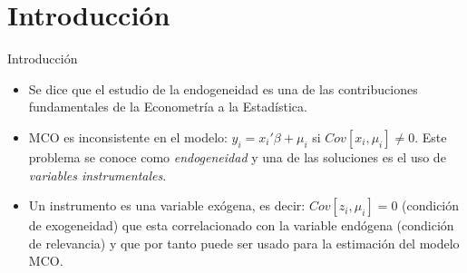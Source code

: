 \section{Introducción}

\begin{frame}{Introducción}
	\begin{itemize}
		\item Se dice que el estudio de la endogeneidad es una de las contribuciones fundamentales de la Econometría a la Estadística.
		\item MCO es inconsistente en el modelo: $y_i=x_i'\beta+\mu_i$ si $Cov[x_i,\mu_i]\neq 0$. Este problema se conoce como \emph{endogeneidad} y una de las soluciones es el uso de \emph{variables instrumentales}.
		\item Un instrumento es una variable exógena, es decir: $Cov[z_i,\mu_i]=0$ (condición de exogeneidad) que esta correlacionado con la variable endógena (condición de relevancia) y que por tanto puede ser usado para la estimación del modelo MCO.
	\end{itemize}
\end{frame}